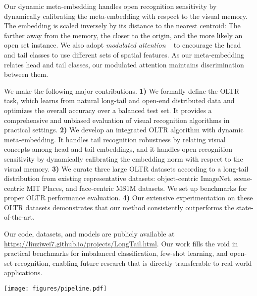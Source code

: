 \documentclass[10pt,twocolumn,letterpaper]{article}
\begin{document}
Our dynamic meta-embedding handles open recognition sensitivity by dynamically calibrating the meta-embedding with respect to the visual memory.
The embedding is scaled inversely by its distance to the nearest centroid: The farther away from the memory, the closer to the origin, and the more likely an  open set instance.
We also adopt \emph{modulated attention}  ~\cite{wang2017non} to encourage the head and tail classes to use different sets of spatial features.
As our meta-embedding relates head and tail classes,  our modulated attention maintains discrimination between them. 

We make the following major contributions.
{\bf 1)}
We formally define the OLTR task, which learns from natural long-tail and open-end distributed data and optimizes the overall accuracy over a balanced test set.  It provides a comprehensive and unbiased evaluation of visual recognition algorithms in practical settings.
{\bf 2)}
We develop an integrated OLTR algorithm with dynamic meta-embedding.  It handles tail recognition robustness by relating visual concepts among head and tail embeddings, and it handles open recognition sensitivity by dynamically calibrating the embedding norm with respect to the visual memory. 
{\bf 3)}
We curate three large OLTR datasets according to a long-tail distribution from existing representative datasets: object-centric ImageNet, scene-centric MIT Places, and face-centric MS1M datasets.  We set up benchmarks for proper OLTR performance evaluation. 
{\bf 4)}
Our extensive experimentation on these OLTR datasets demonstrates that our method consistently outperforms the state-of-the-art.  


Our code, datasets, and models are publicly available at 
\url{https://liuziwei7.github.io/projects/LongTail.html}.
Our work fills the void in practical benchmarks for imbalanced classification, few-shot learning, and open-set recognition, enabling future research that is directly transferable to real-world applications.






















 
\begin{figure*}[t]
  \centering
  \texttt{[image: figures/pipeline.pdf]}
   \caption{\textbf{Method overview.} There are two main modules: dynamic meta-embedding and modulated attention. The embedding relates visual concepts between head and tail classes, while the attention discriminates between them. The {\emph reachability} separates tail and open classes.}
  \label{fig:pipeline}
  \vspace{-6pt}
\end{figure*}
\end{document}
